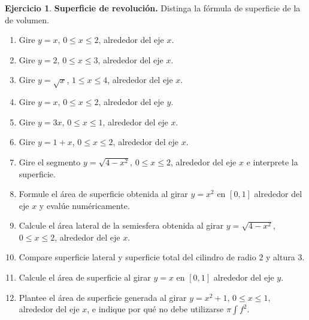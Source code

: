 \documentclass[12pt]{article}
\theoremstyle{definition}
\newtheorem{Ejer}[teorema]{Ejercicio}
\theoremstyle{remark}
\begin{document}
\begin{Ejer}\textbf{Superficie de revolución.} Distinga la fórmula de superficie de la de volumen.
\begin{enumerate}[resume=banco3]
\item Gire $y=x$, $0\le x\le2$, alrededor del eje $x$.
\item Gire $y=2$, $0\le x\le3$, alrededor del eje $x$.
\item Gire $y=\sqrt x$, $1\le x\le4$, alrededor del eje $x$.
\item Gire $y=x$, $0\le x\le2$, alrededor del eje $y$.
\item Gire $y=3x$, $0\le x\le1$, alrededor del eje $x$.
\item Gire $y=1+x$, $0\le x\le2$, alrededor del eje $x$.
\item Gire el segmento $y=\sqrt{4-x^2}$, $0\le x\le2$, alrededor del eje $x$ e interprete la superficie.
\item Formule el área de superficie obtenida al girar $y=x^2$ en $[0,1]$ alrededor del eje $x$ y evalúe numéricamente.
\item Calcule el área lateral de la semiesfera obtenida al girar $y=\sqrt{4-x^2}$, $0\le x\le2$, alrededor del eje $x$.
\item Compare superficie lateral y superficie total del cilindro de radio $2$ y altura $3$.
\item Calcule el área de superficie al girar $y=x$ en $[0,1]$ alrededor del eje $y$.
\item Plantee el área de superficie generada al girar $y=x^2+1$, $0\le x\le1$, alrededor del eje $x$, e indique por qué no debe utilizarse $\pi\int f^2$.
\end{enumerate}
\end{Ejer}
\end{document}
